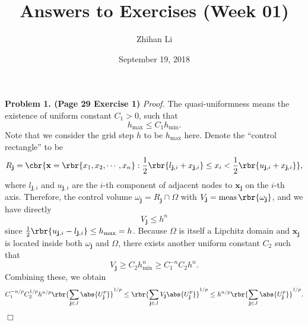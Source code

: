 \documentclass[english, nochinese]{pnote}
\title{Answers to Exercises (Week 01)}
\author{Zhihan Li}
\date{September 19, 2018}
\begin{document}
\maketitle

\textbf{Problem 1. (Page 29 Exercise 1)} \textit{Proof.} The quasi-uniformness means the existence of uniform constant $ C_1 > 0 $, such that
\begin{equation}
h_{\text{max}} \le C_1 h_{\text{min}}.
\end{equation}
Note that we consider the grid step $h$ to be $ h_{\text{max}} $ here. Denote the ``control rectangle'' to be
\begin{equation}
R_{\mathbf{j}} = \cbr{ \mathbf{x} = \rbr{ x_1, x_2, \cdots, x_n } : \frac{1}{2} \rbr{ l_{ \mathbf{j}, i } + x_{ \mathbf{j}, i } } \le x_i < \frac{1}{2} \rbr{ u_{\mathbf{j}, i } + x_{ \mathbf{j}, i } } },
\end{equation}
where $ l_{ \mathbf{j}, i } $ and $ u_{ \mathbf{j}, i } $ are the $i$-th component of adjacent nodes to $\mathbf{x}_{\mathbf{j}}$ on the $i$-th axis.
Therefore, the control volume $ \omega_{\mathbf{j}} = R_{\mathbf{j}} \cap \Omega $ with $ V_{\mathbf{j}} = \mathop{\text{meas}} \rbr{\omega_{\mathbf{j}}} $,
and we have directly
\begin{equation}
V_{\mathbf{j}} \le h^n
\end{equation}
since $ \frac{1}{2} \rbr{ u_{ \mathbf{j}, i } - l_{ \mathbf{j}, i } } \le h_{\text{max}} = h $.
Because $\Omega$ is itself a Lipchitz domain and $\mathbf{x}_{\mathbf{j}}$ is located inside both $\omega_{\mathbf{j}}$ and $\Omega$, there exists another uniform constant $C_2$ such that
\begin{equation}
V_{\mathbf{j}} \ge C_2 h_{\text{min}}^n \ge C_1^{-n} C_2 h^n.
\end{equation}
Combining these, we obtain
\begin{equation}
C_1^{ -n / p } C_2^{ 1 / p } h^{ n / p } \rbr{\sum_{ \mathbf{j} \in J }{\abs{U_{\mathbf{j}}^p}}}^{ 1 / p } \le \rbr{\sum_{ \mathbf{j} \in J }{ V_{\mathbf{j}} \abs{U_{\mathbf{j}}^p} }}^{ 1 / p } \le h^{ n / p } \rbr{\sum_{ \mathbf{j} \in J }{\abs{U_{\mathbf{j}}^p}}}^{ 1 / p }.
\end{equation}

\hfill$\Box$
\end{document}
